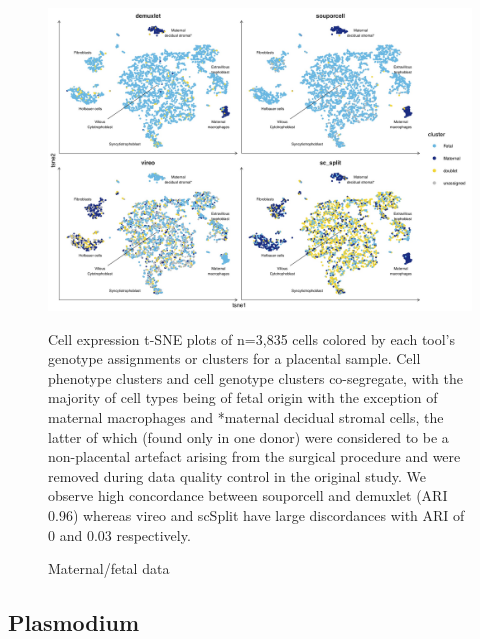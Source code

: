 \begin{figure}[htbp!]
\caption{Maternal/fetal data}
\label{figure:maternal}
\begin{centering}

\includegraphics[width=\textwidth]{maternal.jpg} 
\par{Cell expression t-SNE plots of n=3,835 cells colored by each tool's genotype assignments or clusters for a placental sample. Cell phenotype clusters and cell genotype clusters co-segregate, with the majority of cell types being of fetal origin with the exception of maternal macrophages and *maternal decidual stromal cells, the latter of which (found only in one donor) were considered to be a non-placental artefact arising from the surgical procedure and were removed during data quality control in the original study\cite{maternalfetal}. We observe high concordance between souporcell and demuxlet (ARI 0.96) whereas vireo and scSplit have large discordances with ARI of 0 and 0.03 respectively.}

\end{centering}
\end{figure}


\subsection{Plasmodium}


